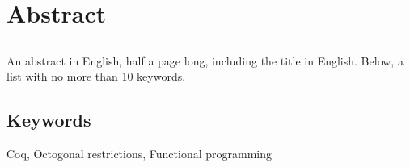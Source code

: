 \chapter*{Abstract}

\section*{\tituloPortadaEngVal}

An abstract in English, half a page long, including the title in English. Below, a list with no more than 10 keywords.


\section*{Keywords}

\noindent Coq, Octogonal restrictions, Functional programming



